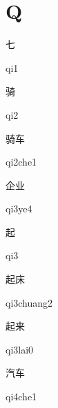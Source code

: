 ﻿%
\section*{Q}

\begin{verbete}[qi1]{七}
\begin{pronuncia}{qi1}
\end{pronuncia}
\end{verbete}

\begin{verbete}[qi2]{骑}
\begin{pronuncia}{qi2}
\end{pronuncia}
\end{verbete}

\begin{verbete}[qi2che1]{骑车}
\begin{pronuncia}{qi2che1}
\end{pronuncia}
\end{verbete}

\begin{verbete}[qi3ye4]{企业}
\begin{pronuncia}{qi3ye4}
\end{pronuncia}
\end{verbete}

\begin{verbete}[qi3]{起}
\begin{pronuncia}{qi3}
\end{pronuncia}
\end{verbete}

\begin{verbete}[qi3chuang2]{起床}
\begin{pronuncia}{qi3chuang2}
\end{pronuncia}
\end{verbete}

\begin{verbete}[qi3lai0]{起来}
\begin{pronuncia}{qi3lai0}
\end{pronuncia}
\end{verbete}

\begin{verbete}[qi4che1]{汽车}
\begin{pronuncia}{qi4che1}
\end{pronuncia}
\end{verbete}

